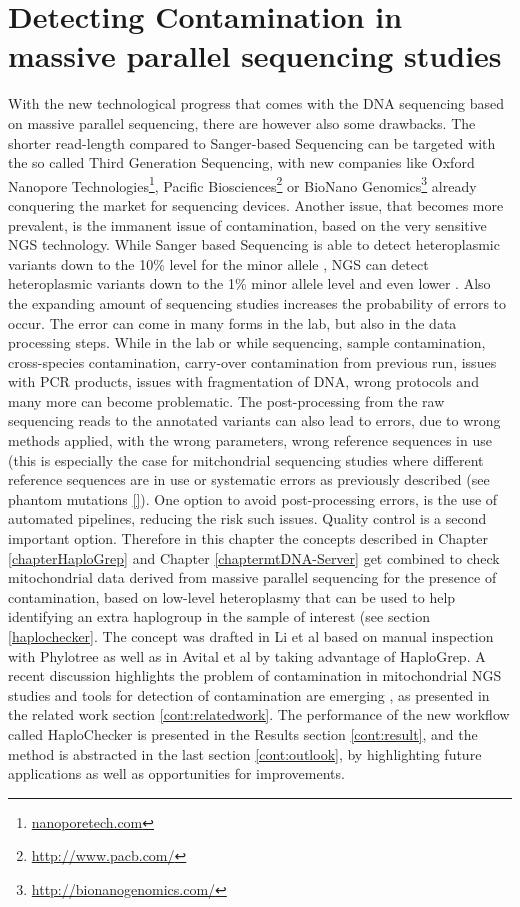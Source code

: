 \chapter{Detecting Contamination in massive parallel sequencing studies}
\label{chapterContamination}
With the new technological progress that comes with the DNA sequencing based on massive parallel sequencing, there are however also some drawbacks. The shorter read-length compared to Sanger-based Sequencing can be targeted with the so called Third Generation Sequencing, with new companies like Oxford Nanopore Technologies\footnote{\url{nanoporetech.com}}, Pacific Biosciences\footnote{\url{http://www.pacb.com/}} or BioNano Genomics\footnote{\url{http://bionanogenomics.com/}} already conquering the market for sequencing devices. Another issue, that becomes more prevalent, is the immanent issue of contamination, based on the very sensitive NGS technology. While Sanger based Sequencing is able to detect heteroplasmic variants down to the 10\% level for the minor allele \cite{Kloss-Brandstatter2015}, NGS can detect heteroplasmic variants down to the 1\% minor allele level and even lower \cite{Li2010}. Also the expanding amount of sequencing studies increases the probability of errors to occur. The error can come in many forms in the lab, but also in the data processing steps. While in the lab or while sequencing, sample contamination, cross-species contamination, carry-over contamination from previous run, issues with PCR products, issues with fragmentation of DNA, wrong protocols and many more can become problematic. The post-processing from the raw sequencing reads to the annotated variants can also lead to errors, due to wrong methods applied, with the wrong parameters, wrong reference sequences in use (this is especially the case for mitchondrial sequencing studies where different reference sequences are in use \cite{Behar2012,Andrews1999} or systematic errors as previously described (see phantom mutations \ref{}). One option to avoid post-processing errors, is the use of automated pipelines, reducing the risk such issues. Quality control is a second important option. Therefore in this chapter the concepts described in Chapter \ref{chapterHaploGrep} and Chapter \ref{chaptermtDNA-Server} get combined to check mitochondrial data derived from massive parallel sequencing for the presence of contamination, based on low-level heteroplasmy that can be used to help identifying an extra haplogroup in the sample of interest (see section \ref{haplochecker}. The concept was drafted in Li et al \cite{Li2010} based on manual inspection with Phylotree as well as in Avital et al \cite{Avital2012} by taking advantage of HaploGrep. A recent discussion highlights the problem of contamination in mitochondrial NGS studies \cite{Ye2014,Just2014, Just2015,Ye2014reply} and tools for detection of contamination are emerging \cite{Renaud2015,Jun2012,Dickins2014}, as presented in the related work section \ref{cont:relatedwork}. The performance of the new workflow called HaploChecker is presented in the Results section \ref{cont:result}, and the method is abstracted in the last section \ref{cont:outlook}, by highlighting future applications as well as opportunities for improvements.

